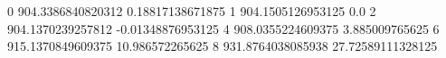 0 904.3386840820312 0.18817138671875
1 904.1505126953125 0.0
2 904.1370239257812 -0.01348876953125
4 908.0355224609375 3.885009765625
6 915.1370849609375 10.986572265625
8 931.8764038085938 27.72589111328125
